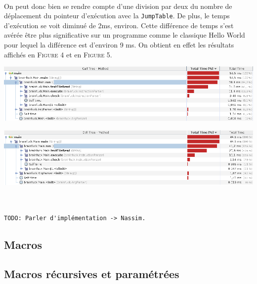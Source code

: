 \documentclass[a4paper]{article}
\begin{document}
\paragraph{}On peut donc bien se rendre compte d'une division par deux du nombre de déplacement du pointeur d'exécution avec la \texttt{JumpTable}. De plus, le temps d'exécution se voit diminué de 2ms, environ. Cette différence de temps s'est avérée être plus significative sur un programme comme le classique Hello World pour lequel la différence est d'environ 9 	ms. On obtient en effet les résultats affichés en \textsc{Figure 4} et en \textsc{Figure 5}.
\begin{center}
	\includegraphics[scale=0.45]{withoutJumptable.png}
	
	\includegraphics[scale=0.45]{withJumptable.png} 
\end{center}

\begin{verbatim}


TODO: Parler d'implémentation -> Nassim.
\end{verbatim}

\subsection{Macros}
\paragraph{}

\subsection{Macros récursives et paramétrées}
\end{document}
